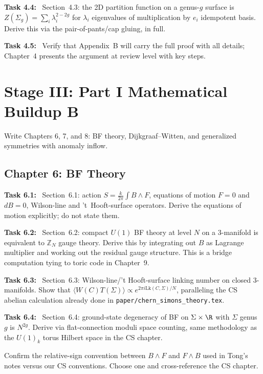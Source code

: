 \documentclass[11pt]{article}
\newcommand{\task}[1]{\medskip\noindent\textbf{Task #1:}\ }
\begin{document}
\task{4.4} Section~4.3: the 2D partition function on a genus-$g$ surface is
$Z(\Sigma_g) = \sum_i \lambda_i^{2-2g}$ for $\lambda_i$ eigenvalues of multiplication
by $e_i$ idempotent basis. Derive this via the pair-of-pants/cap gluing, in full.

\task{4.5} Verify that Appendix~B will carry the full proof with all details; Chapter~4
presents the argument at review level with key steps.

\section{Stage III: Part I Mathematical Buildup B}\label{sec:stageIII}

\begin{goalbox}[Objective]
Write Chapters 6, 7, and 8: BF theory, Dijkgraaf--Witten, and generalized symmetries
with anomaly inflow.
\end{goalbox}

\subsection{Chapter 6: BF Theory}

\task{6.1} Section~6.1: action $S = \frac{k}{2\pi}\int B\wedge F$, equations of motion
$F=0$ and $dB=0$, Wilson-line and 't~Hooft-surface operators. Derive the equations of
motion explicitly; do not state them.

\task{6.2} Section~6.2: compact $U(1)$ BF theory at level $N$ on a 3-manifold is
equivalent to $\mathbb{Z}_N$ gauge theory. Derive this by integrating out $B$ as
Lagrange multiplier and working out the residual gauge structure. This is a bridge
computation tying to toric code in Chapter~9.

\task{6.3} Section~6.3: Wilson-line/'t Hooft-surface linking number on closed
3-manifolds. Show that $\langle W(C) T(\Sigma)\rangle \propto e^{2\pi i \mathrm{Lk}(C,\Sigma)/N}$,
paralleling the CS abelian calculation already done in \texttt{paper/chern\_simons\_theory.tex}.

\task{6.4} Section~6.4: ground-state degeneracy of BF on $\Sigma\times\R$ with
$\Sigma$ genus $g$ is $N^{2g}$. Derive via flat-connection moduli space counting, same
methodology as the $U(1)_k$ torus Hilbert space in the CS chapter.

\begin{warningbox}
Confirm the relative-sign convention between $B\wedge F$ and $F\wedge B$ used in Tong's
notes versus our CS conventions. Choose one and cross-reference the CS chapter.
\end{warningbox}
\end{document}
